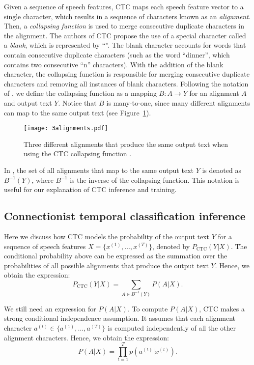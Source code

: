Given a sequence of speech features, CTC maps each speech feature vector to a single character, which results in a sequence of characters known as an \emph{alignment}. 
Then, a \emph{collapsing function} is used to merge consecutive duplicate characters in the alignment.
The authors of CTC propose the use of a special character called a \emph{blank}, which is represented by ``\textvisiblespace''.
The blank character accounts for words that contain consecutive duplicate characters (such as the word ``dinner'', which contains two consecutive ``n'' characters).
With the addition of the blank character, the collapsing function is responsible for merging consecutive duplicate characters and removing all instances of blank characters.
Following the notation of \cite{jurafskyspeech}, we define the collapsing function as a mapping $B: A \rightarrow Y$ for an alignment $A$ and output text $Y$.
Notice that $B$ is many-to-one, since many different alignments can map to the same output text (see Figure~\ref{dinner}).

\begin{figure}
    \centering
    \captionsetup{justification=centering}
    \texttt{[image: 3alignments.pdf]}
    \caption{Three different alignments that produce the same output text when using the CTC collapsing function \cite{jurafskyspeech}.}
    \label{dinner}
\end{figure}

In \cite{jurafskyspeech}, the set of all alignments that map to the same output text $Y$ is denoted as $B^{-1}(Y)$, 
where $B^{-1}$ is the inverse of the collapsing function.
This notation is useful for our explanation of CTC inference and training.

\subsection{Connectionist temporal classification inference}
Here we discuss how CTC models the probability of the output text $Y$ 
for a sequence of speech features $X = \{x^{(1)}, \dots, x^{(T)}\}$, 
denoted by $P_{\text{CTC}}(Y|X)$.
The conditional probability above can be expressed as the summation over the probabilities
of all possible alignments that produce the output text $Y$. 
Hence, we obtain the expression: 
\begin{equation}
    P_{\text{CTC}}(Y|X) = \sum\limits_{A \in B^{-1}(Y)} P(A|X).
\end{equation}

We still need an expression for $P(A|X)$.
To compute $P(A|X)$, CTC makes a strong conditional independence assumption. 
It assumes that each alignment character $a^{(t)} \in \{a^{(1)}, \dots, a^{(T)}\}$ 
is computed independently of all the other alignment characters.
Hence, we obtain the expression:
\begin{equation}
    P(A|X) = \prod\limits_{t=1}^{T} p(a^{(t)} | x^{(t)}).
\end{equation}

